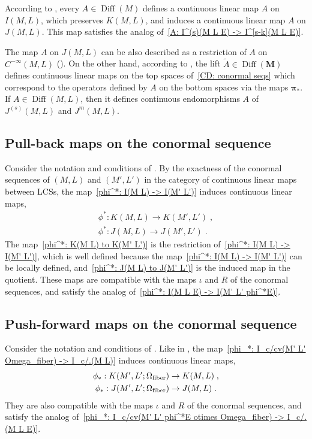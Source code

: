 \documentclass{memo-l}
\theoremstyle{plain}
\theoremstyle{definition}
\theoremstyle{remark}
\newcommand{\bfM}{\boldsymbol{M}}
\newcommand{\bfpi}{\boldsymbol{\pi}}
\newcommand{\Diff}{\operatorname{Diff}}
\newcommand{\fiber}{{\text{\rm fiber}}}
\numberwithin{section}{chapter}
\numberwithin{equation}{section}%
\begin{document}
According to , every $A\in\Diff(M)$ defines a continuous linear map $A$ on $I(M,L)$, which preserves $K(M,L)$, and induces a continuous linear map $A$ on $J(M,L)$. This map satisfies the analog of~\eqref{A: I^(s)(M L E) -> I^[s-k](M L E)}.

The map $A$ on $J(M,L)$ can be also described as a restriction of $A$ on $C^{-\infty}(M,L)$ (). On the other hand,  according to , the lift $\widetilde A\in\Diff(\bfM)$ defines continuous linear maps on the top spaces of~\eqref{CD: conormal seqs} which correspond to the operators defined by $A$ on the bottom spaces via the maps $\bfpi_*$. If $A\in\Diff(M,L)$, then it defines continuous endomorphisms $A$ of $J^{(s)}(M,L)$ and $J^m(M,L)$.



\subsection{Pull-back maps on the conormal sequence}\label{ss: pull-back of the conormal seq}

Consider the notation and conditions of . By the exactness of the conormal sequences of $(M,L)$ and $(M',L')$ in the category of continuous linear maps between LCSs, the map~\eqref{phi^*: I(M L) -> I(M' L')} induces continuous linear maps,
\begin{gather}
\phi^*:K(M,L)\to K(M',L')\;,\label{phi^*: K(M L) to K(M' L')}\\
\phi^*:J(M,L)\to J(M',L')\;.\label{phi^*: J(M L) to J(M' L')}
\end{gather}
The map~\eqref{phi^*: K(M L) to K(M' L')} is the restriction of~\eqref{phi^*: I(M L) -> I(M' L')}, which is well defined because the map~\eqref{phi^*: I(M L) -> I(M' L')} can be locally defined, and~\eqref{phi^*: J(M L) to J(M' L')} is the induced map in the quotient. These maps are compatible with the maps $\iota$ and $R$ of the conormal sequences, and satisfy the analog of~\eqref{phi^*: I(M L E) -> I(M' L' phi^*E)}.


\subsection{Push-forward maps on the conormal sequence}\label{ss: push-forward of the conormal seq}

Consider the notation and conditions of . Like in , the map~\eqref{phi_*: I_c/cv(M' L' Omega_fiber) -> I_c/.(M L)} induces continuous linear maps,
\begin{gather}
\phi_*:K(M',L';\Omega_\fiber)\to K(M,L)\;,\label{phi_*: K(M' L' Omega_fiber) to K(M L)}\\
\phi_*:J(M',L';\Omega_\fiber)\to J(M,L)\;.
\label{phi_*: J(M' L' Omega_fiber) to J(M L)}
\end{gather}
They are also compatible with the maps $\iota$ and $R$ of the conormal sequences, and satisfy the analog of~\eqref{phi_*: I_c/cv(M' L' phi^*E otimes Omega_fiber) -> I_c/.(M L E)}.
\end{document}
